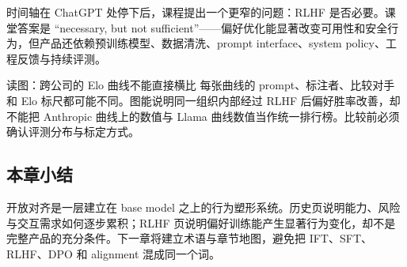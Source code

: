 时间轴在 ChatGPT 处停下后，课程提出一个更窄的问题：RLHF 是否必要。课堂答案是 ``necessary, but not sufficient''——偏好优化能显著改变可用性和安全行为，但产品还依赖预训练模型、数据清洗、prompt interface、system policy、工程反馈与持续评测。




\begin{knowledgebox}{读图：跨公司的 Elo 曲线不能直接横比}
每张曲线的 prompt、标注者、比较对手和 Elo 标尺都可能不同。图能说明同一组织内部经过 RLHF 后偏好胜率改善，却不能把 Anthropic 曲线上的数值与 Llama 曲线数值当作统一排行榜。比较前必须确认评测分布与标定方式。
\end{knowledgebox}


\subsection{本章小结}

开放对齐是一层建立在 base model 之上的行为塑形系统。历史页说明能力、风险与交互需求如何逐步累积；RLHF 页说明偏好训练能产生显著行为变化，却不是完整产品的充分条件。下一章将建立术语与章节地图，避免把 IFT、SFT、RLHF、DPO 和 alignment 混成同一个词。

